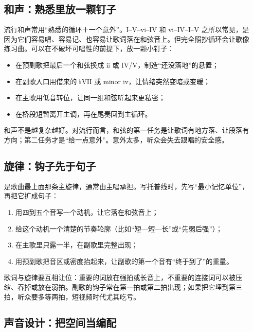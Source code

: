 \subsection{和声：熟悉里放一颗钉子}
\label{sec:pop-harmony}

流行和声常用“熟悉的循环＋一个意外”。I–V–vi–IV 和 vi–IV–I–V 之所以常见，是因为它们容易唱、容易记、也容易让歌词落在和弦音上。但完全照抄循环会让歌像练习曲。可以在不破坏可唱性的前提下，放一颗小钉子：

\begin{itemize}
\item 在预副歌把最后一个和弦换成 ii 或 IV/V，制造“还没落地”的悬置；
\item 在副歌入口用借来的 $\flat$VII 或 minor iv，让情绪突然变暗或变暖；
\item 在主歌用低音转位，让同一组和弦听起来更私密；
\item 在桥段短暂离开主调，再在尾奏回到主循环。
\end{itemize}

和声不是越复杂越好。对流行而言，和弦的第一任务是让歌词有地方落、让段落有方向；第二任务才是“给一点意外”。意外太多，听众会失去跟唱的安全感。

\subsection{旋律：钩子先于句子}
\label{sec:pop-melody}

是歌曲最上面那条主旋律，通常由主唱承担。写托普线时，先写“最小记忆单位”，再把它扩成句子：

\begin{enumerate}
\item 用四到五个音写一个动机，让它落在和弦音上；
\item 给这个动机一个清楚的节奏轮廓（比如“短—短—长”或“先弱后强”）；
\item 在主歌里只露一半，在副歌里完整出现；
\item 用预副歌把音区或密度抬起来，让副歌的第一个音有“终于到了”的重量。
\end{enumerate}

歌词与旋律要互相让位：重要的词放在强拍或长音上，不重要的连接词可以被压缩、吞掉或放在弱拍。副歌的钩子常在第一拍或第二拍出现；如果把它埋到第三拍，听众要多等两拍，短视频时代尤其吃亏。

\subsection{声音设计：把空间当编配}
\label{sec:pop-sound}

